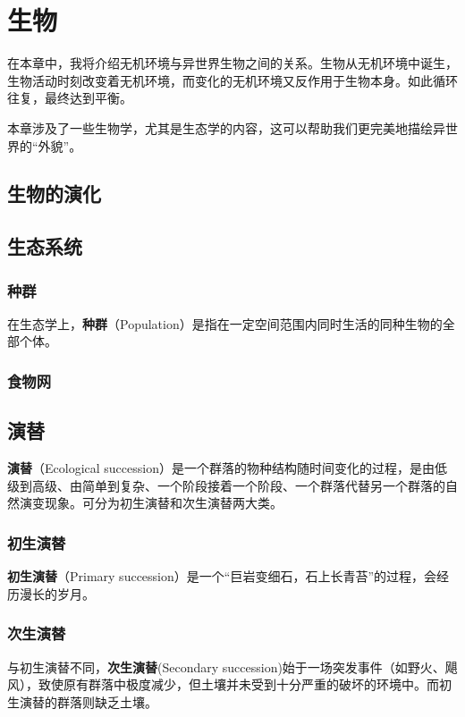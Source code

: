 \chapter{生物}
在本章中，我将介绍无机环境与异世界生物之间的关系。生物从无机环境中诞生，生物活动时刻改变着无机环境，而变化的无机环境又反作用于生物本身。如此循环往复，最终达到平衡。

本章涉及了一些生物学，尤其是生态学的内容，这可以帮助我们更完美地描绘异世界的“外貌”。

\section{生物的演化}

\section{生态系统}

\subsection{种群}
在生态学上，\textbf{种群}（Population）是指在一定空间范围内同时生活的同种生物的全部个体。

\subsection{食物网}

\section{演替}
\textbf{演替}（Ecological succession）是一个群落的物种结构随时间变化的过程，是由低级到高级、由简单到复杂、一个阶段接着一个阶段、一个群落代替另一个群落的自然演变现象。可分为初生演替和次生演替两大类。

\subsection{初生演替}
\textbf{初生演替}（Primary succession）是一个“巨岩变细石，石上长青苔”的过程，会经历漫长的岁月。

\subsection{次生演替}
与初生演替不同，\textbf{次生演替}(Secondary succession)始于一场突发事件（如野火、飓风），致使原有群落中极度减少，但土壤并未受到十分严重的破坏的环境中。而初生演替的群落则缺乏土壤。
